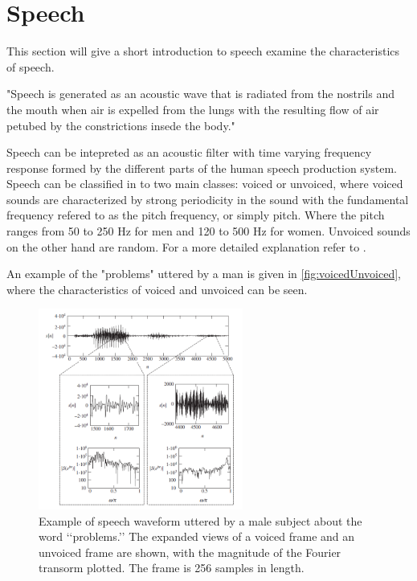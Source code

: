 \section{Speech} \label{sec:Speech}
This section will give a short introduction to speech examine the characteristics of speech. 

"Speech is generated as an acoustic wave that is radiated from the nostrils and the mouth when air is expelled from the lungs with the resulting flow of air petubed by the constrictions insede the body."

Speech can be intepreted as an acoustic filter with time varying frequency response formed by the different parts of the human speech production system. Speech can be classified in to two main classes: voiced or unvoiced, where voiced sounds are characterized by strong periodicity in the sound with the fundamental frequency refered to as the pitch frequency, or simply pitch. Where the pitch ranges from 50 to 250 Hz for men and 120 to 500 Hz for women. Unvoiced sounds on the other hand are random. For a more detailed explanation refer to . 

An example of the "problems" uttered by a man is given in \autoref{fig:voicedUnvoiced}, where the characteristics of voiced and unvoiced can be seen. 

\begin{figure}[H]
	\centering
	\includegraphics[width=0.6\textwidth]{figures/Speech/VoicedvsUnvoiced}
	\caption{Example of speech waveform uttered by a male subject about the word ‘‘problems.’’ The expanded views of a voiced frame and an unvoiced frame are shown, with the magnitude of the Fourier transorm plotted. The frame is 256 samples in length.}
	\label{fig:voicedUnvoiced}
\end{figure}   

